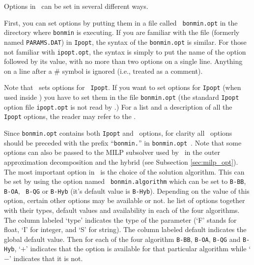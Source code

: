 \StartPageSummary
{}
\EndPageSummary
\NavigationPanel

Options in \Bonmin\ can be set in several different ways.

First, you can set options by putting them in a file called {\tt
bonmin.opt} in the directory where {\tt bonmin} is executing. If you
are familiar with the file
 (formerly named {\tt PARAMS.DAT}) in {\tt Ipopt}, the
syntax of the {\tt bonmin.opt} is similar. For those not familiar
with {\tt ipopt.opt}, the syntax is simply to put the name of the
option followed by its value, with no more than two options on a
single line. Anything on a line after a \# symbol is ignored (i.e.,
treated as a comment).

Note that \Bonmin\ sets options for {\tt
Ipopt}. If you want to set options for {\tt Ipopt} (when used inside \Bonmin) you have to set them
in the file {\tt bonmin.opt} (the standard {\tt Ipopt} option file {\tt ipopt.opt}
is not read by \Bonmin.)
For a list and a description of all the {\tt Ipopt} options, the
reader may refer to the
.

Since {\tt bonmin.opt} contains both {\tt Ipopt} and \Bonmin\ options, for clarity
all \Bonmin\ options should be preceded with the prefix ``{\tt bonmin.}'' in {\tt bonmin.opt}~.
Note that some options can also be passed to the MILP subsolver used by \Bonmin\
in the outer approximation decomposition
and the hybrid (see Subsection \ref{sec:milp_opt}).\\

The most important option in \Bonmin\ is the choice of the solution
algorithm. This can be set by using the option named {\tt
bonmin.algorithm} which can be set to {\tt B-BB}, {\tt B-OA}, {\tt
B-QG} or {\tt B-Hyb} (it's default value is {\tt B-Hyb}). Depending
on the value of this option, certain other options may be available
or not. \latexhtml{Table \ref{tab:options} gives t}{T}he list of options together
with their types, default values and availability in each of the
four algorithms. The column labeled `type' indicates the type of the
parameter (`F' stands for float, `I' for integer, and `S' for
string). The column labeled default indicates the global default
value. Then for each of the four algorithm {\tt B-BB}, {\tt B-OA},
{\tt B-QG} and {\tt B-Hyb}, `$+$' indicates that the option is
available for that particular algorithm
while `$-$' indicates that it is not.\\

